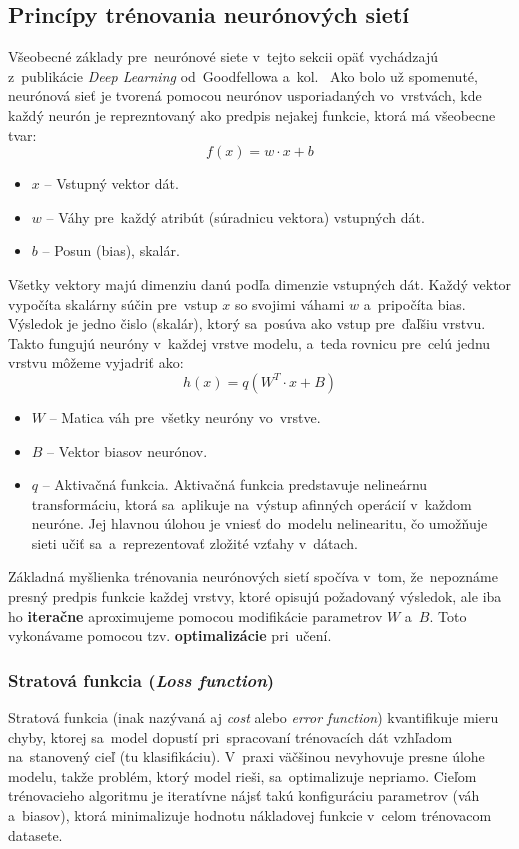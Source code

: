 \subsection{Princípy trénovania neurónových sietí}
Všeobecné základy pre~neurónové siete v~tejto sekcii opäť vychádzajú z~publikácie \textit{Deep Learning} od~Goodfellowa a~kol.~\cite{Goodfellow-et-al-2016} Ako bolo už spomenuté, neurónová sieť je tvorená pomocou neurónov usporiadaných vo~vrstvách, kde každý neurón je reprezntovaný ako predpis nejakej funkcie, ktorá má všeobecne tvar:
\begin{equation}
    f(x) = w \cdot x + b
\end{equation}
\begin{itemize}
    \item $x$ -- Vstupný vektor dát.
    \item $w$ -- Váhy pre~každý atribút (súradnicu vektora) vstupných dát.
    \item $b$ -- Posun (bias), skalár.
\end{itemize}
Všetky vektory majú dimenziu danú podľa dimenzie vstupných dát. Každý vektor vypočíta skalárny súčin pre~vstup $x$ so svojimi váhami $w$ a~pripočíta bias. Výsledok je jedno čislo (skalár), ktorý sa~posúva ako vstup pre~ďaľšiu vrstvu.
Takto fungujú neuróny v~každej vrstve modelu, a~teda rovnicu pre~celú jednu vrstvu môžeme vyjadriť ako:
\begin{equation}
    h(x) = q(W^T\cdot x + B)
\end{equation}
\begin{itemize}
    \item $W$ -- Matica váh pre~všetky neuróny vo~vrstve.
    \item $B$ -- Vektor biasov neurónov.
    \item $q$ -- Aktivačná funkcia. Aktivačná funkcia predstavuje nelineárnu transformáciu, ktorá sa~aplikuje na~výstup afinných operácií v~každom neuróne. Jej hlavnou úlohou je vniesť do~modelu nelinearitu, čo umožňuje sieti učiť sa~a~reprezentovať zložité vzťahy v~dátach.
\end{itemize}
Základná myšlienka trénovania neurónových sietí spočíva v~tom, že~nepoznáme presný predpis funkcie každej vrstvy, ktoré opisujú požadovaný výsledok, ale iba ho \textbf{iteračne} aproximujeme pomocou modifikácie parametrov $W$ a~$B$. Toto vykonávame pomocou tzv. \textbf{optimalizácie} pri~učení.

\subsubsection{Stratová funkcia (\textit{Loss function})}
Stratová funkcia (inak nazývaná aj \textit{cost} alebo \textit{error function}) kvantifikuje mieru chyby, ktorej sa~model dopustí pri~spracovaní trénovacích dát vzhľadom na~stanovený cieľ (tu klasifikáciu). V~praxi väčšinou nevyhovuje presne úlohe modelu, takže problém, ktorý model rieši, sa~optimalizuje nepriamo. Cieľom trénovacieho algoritmu je iteratívne nájsť takú konfiguráciu parametrov (váh a~biasov), ktorá minimalizuje hodnotu nákladovej funkcie v~celom trénovacom datasete.

